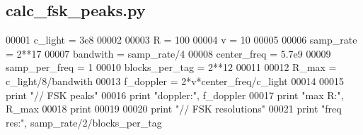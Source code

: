 \subsection{calc\+\_\+fsk\+\_\+peaks.\+py}
\label{calc__fsk__peaks_8py_source}

\begin{DoxyCode}
00001 c\_light = 3e8
00002 
00003 R = 100
00004 v = 10
00005 
00006 samp\_rate = 2**17
00007 bandwith = samp\_rate/4
00008 center\_freq = 5.7e9
00009 samp\_per\_freq = 1
00010 blocks\_per\_tag = 2**12
00011 
00012 R\_max = c\_light/8/bandwith
00013 f\_doppler = 2*v*center\_freq/c\_light
00014 
00015 \textcolor{keywordflow}{print} \textcolor{stringliteral}{"// FSK peaks"}
00016 \textcolor{keywordflow}{print} \textcolor{stringliteral}{"doppler:"}, f\_doppler
00017 \textcolor{keywordflow}{print} \textcolor{stringliteral}{"max R:"}, R\_max
00018 \textcolor{keywordflow}{print}
00019 
00020 \textcolor{keywordflow}{print} \textcolor{stringliteral}{"// FSK resolutions"}
00021 \textcolor{keywordflow}{print} \textcolor{stringliteral}{"freq res:"}, samp\_rate/2/blocks\_per\_tag
\end{DoxyCode}
